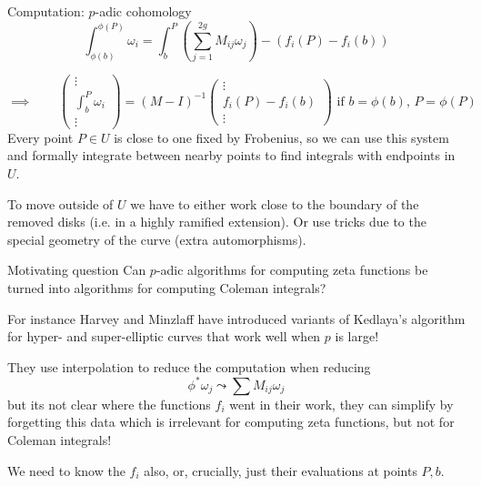 \begin{frame}{Computation: $p$-adic cohomology}
    \[\int_{\phi(b)}^{\phi(P)} \omega_i = \int_b^P \left(\sum_{j=1}^{2g} M_{ij} \omega_j\right)  - \left( f_i(P) - f_i(b) \right)\]

    \begin{equation*}
        \implies \qquad
        \left(\begin{smallmatrix} \vdots \\ \int_{b}^{P} \omega_i \\\vdots \end{smallmatrix}\right) = (M - I)^{-1} \left(\begin{smallmatrix}\vdots \\ f_i(P) - f_i(b) \\ \vdots \end{smallmatrix}\right) \text{ if }b = \phi(b),\,P = \phi(P)
    \end{equation*}\pause
    Every point $P\in U$ is close to one fixed by Frobenius, so we can use this system and formally integrate between nearby points to find integrals with endpoints in $U$.\pause

    To move outside of $U$ we have to either work close to the boundary of the removed disks (i.e. in a highly ramified extension). Or use tricks due to the special geometry of the curve (extra automorphisms).
\end{frame}

\begin{frame}{Motivating question}
    Can $p$-adic algorithms for computing zeta functions be turned into algorithms for computing Coleman integrals? \pause

    For instance Harvey and Minzlaff have introduced variants of Kedlaya's algorithm for hyper- and super-elliptic curves that work well when $p$ is large!\pause

    They use interpolation to reduce the computation when reducing
    \[\phi^* \omega_j \leadsto \sum M_{ij} \omega_j\]
    but its not clear where the functions $f_i$ went in their work, they can simplify by forgetting this data which is irrelevant for computing zeta functions, \pause but not for Coleman integrals!

    We need to know the $f_i$ also, or, crucially, just their evaluations at points $P, b$.
\end{frame}


